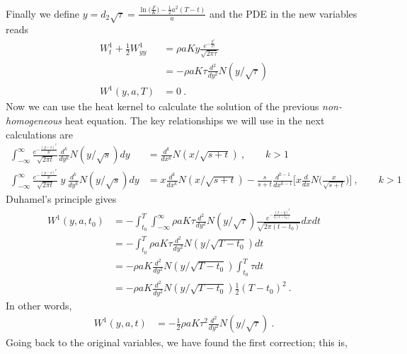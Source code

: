 \documentclass[10pt]{article}
\numberwithin{equation}{section}
\begin{document}
Finally we define $y=d_2 \sqrt{\tau} = \frac{ \ln\bigl( \frac{F}{K}\bigr) - \frac{1}{2} a^2 (T-t)}{a}$ and the PDE in the new variables reads
\begin{equation}\label{order_1}
	\begin{split}
	W_t^{1} + \frac{1}{2}  W_{yy}^{1} &=\rho a  K  y \frac{e^{-\frac{y^2}{2 \tau}}}{\sqrt{2\pi \tau}}\\
	&= -\rho a K \tau \frac{d^2}{dy^2}N(y/\sqrt{\tau}) \\
	W^{1}(y,a,T)&=0\:.
	\end{split}
\end{equation}
Now we can use the heat kernel to calculate the solution of the previous \emph{non-homogeneous} heat equation. The key relationships we will use in the next calculations are
\begin{equation}\label{heat_kernel}
	\begin{split}
	\int_{-\infty}^{\infty}\frac{e^{-\frac{(y-x)^2}{2 t}}}{\sqrt{2\pi t}} \frac{d^k}{dy^k} N(y/\sqrt{s})dy&=\frac{d^k}{dx^k} N(x/\sqrt{s+t}) \:, \qquad k>1\\
	\int_{-\infty}^{\infty}\frac{e^{-\frac{(y-x)^2}{2 t}}}{\sqrt{2\pi t}} \:y\:\frac{d^k}{dy^k} N(y/\sqrt{s})dy&=x \frac{d^k}{dx^k} N(x/\sqrt{s+t}) -\frac{s}{s+t} \frac{d^{k-1}}{dx^{k-1}}\biggl[ x \frac{d}{dx}N\biggl( \frac{x}{\sqrt{s+t}}\biggr)\biggr]\:, \qquad k>1
	\end{split}
\end{equation}
Duhamel's principle gives
\begin{equation*}
	\begin{split}
	W^{1}(y,a,t_0)&=-\int_{t_0}^{T}\int_{-\infty}^{\infty} \rho a K \tau \frac{d^2}{dy^2}N(y/\sqrt{\tau}) \frac{e^{-\frac{(x-y)^2}{2 (t-t_0)}}}{\sqrt{2\pi (t-t_0)}} dx dt\\
	&=-\int_{t_0}^{T} \rho a K \tau \frac{d^2}{dy^2}N(y/\sqrt{T-t_0})dt\\
	&=-\rho a K \frac{d^2}{dy^2}N(y/\sqrt{T-t_0})\int_{t_0}^{T}  \tau dt\\
	&=-\rho a K \frac{d^2}{dy^2}N(y/\sqrt{T-t_0})\frac{1}{2}(T-t_0)^2\:.
	\end{split}
\end{equation*}
In other words,
\begin{equation*}
	\begin{split}
	W^{1}(y,a,t)&=-\frac{1}{2}\rho a K \tau^2 \frac{d^2}{dy^2}N(y/\sqrt{\tau})\:.
	\end{split}
\end{equation*}
Going back to the original variables, we have found the first correction; this is,
\end{document}
